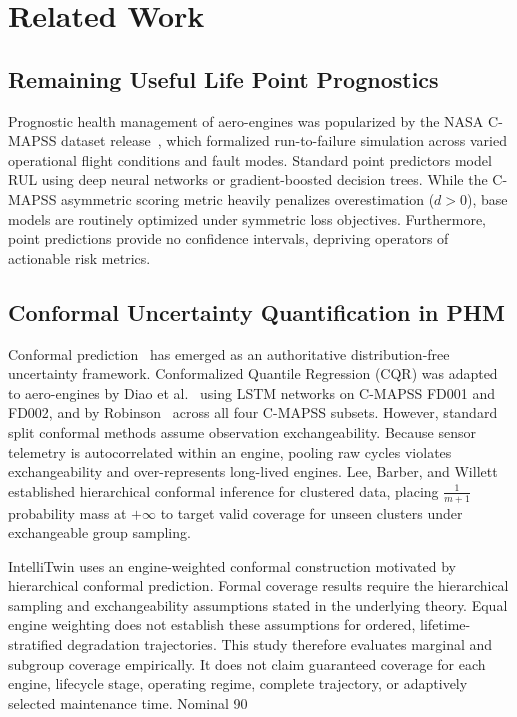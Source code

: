 \section{Related Work}
\label{sec:related_work}

\subsection{Remaining Useful Life Point Prognostics}
Prognostic health management of aero-engines was popularized by the NASA C-MAPSS dataset release~\cite{saxena2008damage}, which formalized run-to-failure simulation across varied operational flight conditions and fault modes. Standard point predictors model RUL using deep neural networks or gradient-boosted decision trees. While the C-MAPSS asymmetric scoring metric heavily penalizes overestimation ($d > 0$), base models are routinely optimized under symmetric loss objectives. Furthermore, point predictions provide no confidence intervals, depriving operators of actionable risk metrics.

\subsection{Conformal Uncertainty Quantification in PHM}
Conformal prediction~\cite{javanmardi2023conformal} has emerged as an authoritative distribution-free uncertainty framework. Conformalized Quantile Regression (CQR) was adapted to aero-engines by Diao et al.~\cite{diao2026turbofan} using LSTM networks on C-MAPSS FD001 and FD002, and by Robinson~\cite{robinson2026riskaware} across all four C-MAPSS subsets. However, standard split conformal methods assume observation exchangeability. Because sensor telemetry is autocorrelated within an engine, pooling raw cycles violates exchangeability and over-represents long-lived engines. Lee, Barber, and Willett~\cite{lee2023hierarchical} established hierarchical conformal inference for clustered data, placing $\frac{1}{m+1}$ probability mass at $+\infty$ to target valid coverage for unseen clusters under exchangeable group sampling.

IntelliTwin uses an engine-weighted conformal construction motivated by hierarchical conformal prediction. Formal coverage results require the hierarchical sampling and exchangeability assumptions stated in the underlying theory. Equal engine weighting does not establish these assumptions for ordered, lifetime-stratified degradation trajectories. This study therefore evaluates marginal and subgroup coverage empirically. It does not claim guaranteed coverage for each engine, lifecycle stage, operating regime, complete trajectory, or adaptively selected maintenance time. Nominal 90%


